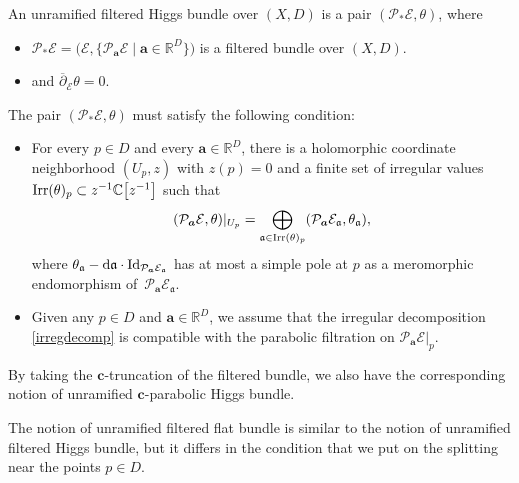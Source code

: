 \begin{Definition}\label{filteredhiggsdef} An unramified filtered Higgs bundle over $(X,D)$ is a pair $(\mathcal{P}_*\mathcal{E},\theta)$, where
\begin{itemize}\itemsep=0pt
 \item $\mathcal{P}_*\mathcal{E}=\bigl(\mathcal{E},\bigl\{\mathcal{P}_{\boldsymbol{a}}\mathcal{E} \mid \boldsymbol{a} \in \mathbb{R}^{D}\bigr\}\bigr)$ is a filtered bundle over $(X,D)$.
 \item {} and $\overline{\partial}_{\mathcal{E}}\theta=0$.
\end{itemize}
The pair $(\mathcal{P}_*\mathcal{E},\theta)$ must satisfy the following condition:
\begin{itemize}\itemsep=0pt
 \item For every $p\in D$ and every $\boldsymbol{a}\in \mathbb{R}^{D}$, there is a holomorphic coordinate neighborhood $(U_p,z)$ with $z(p)=0$ and a finite set of irregular values $\textnormal{Irr}(\theta)_p\subset z^{-1}\mathbb{C}\bigl[z^{-1}\bigr]$ such that
 \begin{equation}\label{irregdecomp}
 (\mathcal{P}_{\boldsymbol{a}}\mathcal{E},\theta)|_{U_p}=\bigoplus_{\mathfrak{a}\in \textnormal{Irr}(\theta)_p}(\mathcal{P}_{\boldsymbol{a}}\mathcal{E}_{\mathfrak{a}},\theta_{\mathfrak{a}}),
\end{equation}
where $\theta_{\mathfrak{a}}-{\rm d}\mathfrak{a}\cdot\textnormal{Id}_{\mathcal{P}_{\boldsymbol{a}}\mathcal{E}_{\mathfrak{a}}}$ has at most a simple pole at $p$ as a meromorphic endomorphism of~$\mathcal{P}_{\boldsymbol{a}}\mathcal{E}_{\mathfrak{a}}$.
\item Given any $p\in D$ and $\boldsymbol{a}\in \mathbb{R}^D$, we assume that the irregular decomposition \eqref{irregdecomp} is compatible with the parabolic filtration on $\mathcal{P}_{\boldsymbol{a}}\mathcal{E}|_p$.
\end{itemize}

By taking the $\boldsymbol{c}$-truncation of the filtered bundle, we also have the corresponding notion of unramified $\boldsymbol{c}$-parabolic Higgs bundle.
\end{Definition}

The notion of unramified filtered flat bundle is similar to the notion of unramified filtered Higgs bundle, but it differs in the condition that we put on the splitting near the points $p\in D$.

